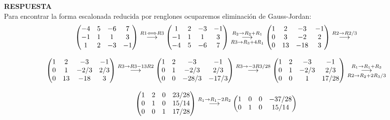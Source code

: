 \documentclass[11pt,letterpaper]{article}
\newcommand{\res}{\textbf{RESPUESTA}\\}
\newcommand{\grstep}[2][\relax]{%
   \ensuremath{\mathrel{
       {\mathop{\longrightarrow}\limits^{#2\mathstrut}_{
                                     \begin{subarray}{l} #1 \end{subarray}}}}}}
\begin{document}
\begin{enumerate}
\res
Para encontrar la forma escalonada reducida por renglones ocuparemos eliminación de Gauss-Jordan:
\begin{equation*}
\begin{array}{c}
\begin{pmatrix}
-4 & 5 & -6 &7\\
-1 & 1 &  1 &3\\
1  & 2 & -3 &-1
\end{pmatrix}
%
\grstep[]{R1 \Longleftrightarrow R3}
\begin{pmatrix}
1  & 2 & -3 &-1\\
-1 & 1 &  1 &3\\
-4 & 5 & -6 &7
\end{pmatrix}%
\grstep[R3 \rightarrow R_3 +4R_1]{R_2 \rightarrow R_2 +R_1}
%
\begin{pmatrix}
1  & 2 & -3 &-1\\
0 & 3  & -2 & 2\\
0 & 13 & -18 &3
\end{pmatrix}%
\grstep[]{R2 \rightarrow R2/3}
\\
\\
\begin{pmatrix}
1  & 2 & -3 &-1\\
0 &  1 & -2/3 & 2/3\\
0 & 13 & -18 &3
\end{pmatrix}%
\grstep[]{R3 \rightarrow R3-13R2}
%
\begin{pmatrix}
1  & 2 & -3 &-1\\
0 &  1 & -2/3 & 2/3\\
0 &  0 & -28/3 & -17/3
\end{pmatrix}%
\grstep[]{R3 \rightarrow -3R3/28}
%
\begin{pmatrix}
1  & 2 & -3 &-1\\
0 &  1 & -2/3 & 2/3\\
0 &  0 & 1 & 17/28
\end{pmatrix}%
\grstep[R2 \rightarrow R_2+2R_3/3]{R_1 \rightarrow R_1 +R_3}\\ \\
\begin{pmatrix}
1  & 2 & 0 & 23/28\\
0 &  1 & 0 & 15/14\\
0 &  0 & 1 & 17/28
\end{pmatrix}%
\grstep[]{R_1 \rightarrow R_1 -2R_2}%
\begin{pmatrix}
1  & 0 & 0 & -37/28\\
0 &  1 & 0 & 15/14\\

\end{pmatrix}
\end{array}
\end{equation*}
\end{enumerate}
\end{document}
